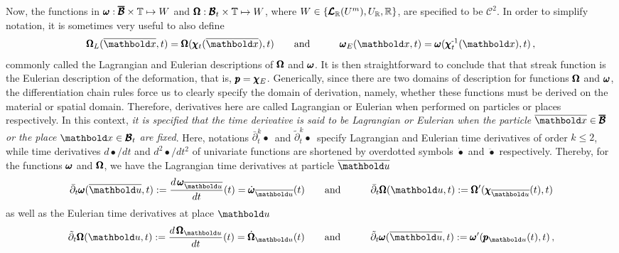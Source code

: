 Now, the functions in  $\pmb{\omega} : \pmb{\overline{\mathcal{B}}}\times\mathbb{T} \mapsto W$ and $\pmb{\Omega} : \pmb{\mathcal{B}}_t\times\mathbb{T} \mapsto W$, where $W\in\{\pmb{\mathcal{L}}_{\mathbb{R}}(U^m),U_{\mathbb{R}},\mathbb{R}\}$, are specified to be $\mathcal{C}^2$. In order to simplify notation, it is sometimes very useful to also define  
\begin{alignat}{3}\label{eq:LagEulDesc} 
\tnr{\Omega}_L(\overline{\vto{x}},t)=\tnr{\Omega}(\fua{\tnr{\chi}_t}{\overline{\vto{x}}},t)&\qquad \text{and}\qquad & \tnr{\omega}_E(\vto{x},t)=\tnr{\omega}(\fua{\tnr{\chi}_t^\text{-1}}{{\vto{x}}},t)\,,
\end{alignat}
commonly called the Lagrangian and Eulerian descriptions of $\pmb{\Omega}$ and $\pmb{\omega}$. It is then straightforward to conclude that that streak function  is the Eulerian description of the deformation, that is, $\pmb{p}=\pmb{\chi}_E$. Generically, since there are two domains of description for functions $\pmb{\Omega}$ and $\pmb{\omega}$, the differentiation chain rules force us to clearly specify the domain of derivation, namely, whether these functions must be derived on the material or spatial domain. Therefore, derivatives here are called Lagrangian or Eulerian when performed on particles or places respectively. In this context, \emph{it is specified that the time derivative is said to be Lagrangian or Eulerian when the particle $\overline{\vto{x}}\in\tnr{\overline{\mathcal{B}}}$ or the place $\vto{x}\in\tnr{\mathcal{B}}_t$ are fixed}. Here, notations ${\bar{\partial}}_t^k\bullet\,$ and ${\tilde{\partial}}_t^k\bullet\,$ specify Lagrangian and Eulerian time derivatives of order $k\leqslant 2$, while time derivatives $d\bullet/dt$ and $d^2\bullet/dt^2$ of univariate functions are shortened by overdotted symbols $\dot{\bullet}$ and $\ddot{\bullet}$ respectively. Thereby, for the functions $\pmb{\omega}$ and $\pmb{\Omega}$, we have the Lagrangian time derivatives at particle $\overline{\vto{u}}$
\begin{alignat}{3}\label{eq:LagDesc} 
\bar{\partial}_t\tnr{\omega}(\overline{\vto{u}},t):=\dfrac{d\,\tnr{\omega}_{\overline{\vto{u}}}}{dt}(t)={\dot{\tnr{\omega}}}_{\overline{\vto{u}}}(t)&\qquad \text{and}\qquad & \bar{\partial}_t\tnr{\Omega}(\vto{u},t):=\tnr{\Omega}'(\fua{\tnr{\chi}_{\overline{\vto{u}}}}{t},t)
\end{alignat}
as well as the Eulerian time derivatives at place ${\vto{u}}$
\begin{alignat}{3}\label{eq:EulDesc} 
\tilde{\partial}_t\tnr{\Omega}({\vto{u}},t):=\dfrac{d\,\tnr{\Omega}_{{\vto{u}}}}{dt}(t)={\dot{\tnr{\Omega}}}_{{\vto{u}}}(t)&\qquad \text{and}\qquad & \tilde{\partial}_t\tnr{\omega}(\overline{\vto{u}},t):=\tnr{\omega}'(\fua{\tnr{p}_{\vto{u}}}{t},t)\,,
\end{alignat}
